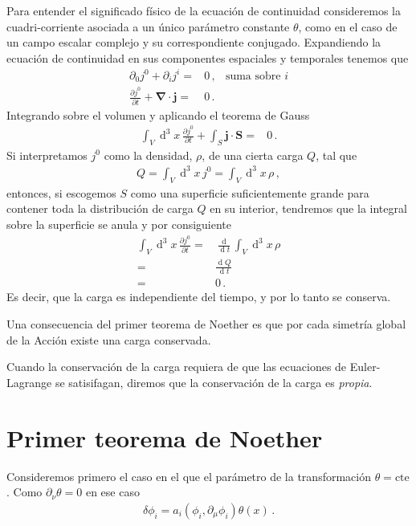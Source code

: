 Para entender el significado físico de la ecuación de continuidad consideremos la cuadri-corriente asociada a un único parámetro constante $\theta$, como en el caso de un campo escalar complejo y su correspondiente conjugado. Expandiendo la ecuación de continuidad en sus componentes espaciales y temporales tenemos que
\begin{align}
  \partial_0 j^0+ \partial_i j^i=&0\,,&\text{suma sobre $i$}\nonumber\\
  \frac{\partial j^0}{\partial t}+ \boldsymbol{\nabla}\cdot\boldsymbol{j}=&0\,.
\end{align}
Integrando sobre el volumen y aplicando el teorema de Gauss
\begin{align}
  \int_V \operatorname{d}^3x\,\frac{\partial j^0}{\partial t}
+\int_S \boldsymbol{j}\cdot \boldsymbol{S}=&0\,.
\end{align}
Si interpretamos $j^0$ como la densidad, $\rho$, de una cierta carga $Q$, tal que
\begin{align}
  Q=\int_{V} \operatorname{d}^3x\, j^0= \int_{V} \operatorname{d}^3x\, \rho\,,
\end{align}
entonces, si escogemos $S$ como una superficie suficientemente grande para contener toda la distribución de carga $Q$ en su interior, tendremos que la integral sobre la superficie se anula y por consiguiente
\begin{align}
  \int_V \operatorname{d}^3x\,\frac{\partial j^0}{\partial t}=&
\frac{\operatorname{d}}{\operatorname{d}t}\int_V \operatorname{d}^3x\,\rho \nonumber\\
=&\frac{\operatorname{d}Q}{\operatorname{d}t}\nonumber\\
  =&0\,.
\end{align}
Es decir, que la carga es independiente del tiempo, y por lo tanto se conserva.

Una consecuencia del primer teorema de Noether es que por cada simetría global de la Acción existe una carga conservada. 

Cuando la conservación de la carga requiera de que las ecuaciones de Euler-Lagrange se satisifagan, diremos que la conservación de la carga es \emph{propia}.



\section{Primer teorema de Noether}

Consideremos primero el caso en el que el parámetro de la transformación $\theta=\text{cte}$. Como $\partial_{\nu}\theta=0$ en ese caso
\begin{align}
\label{eq:infdt}
 \delta\phi_i= a_{i}\left( \phi_{i},\partial_{\mu}\phi_{i} \right) \theta(x)\,.
\end{align}



